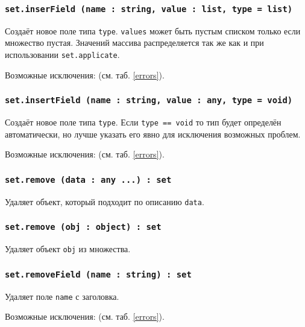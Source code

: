 \subsubsection{\texttt{set.inserField (name : string, value : list, type = list)}}

Создаёт новое поле типа \texttt{type}. \texttt{values} может быть пустым списком только если множество пустая. Значений массива распределяется так же как и при использовании \texttt{set.applicate}.

Возможные исключения:  (см. таб. \ref{errors}).

\subsubsection{\texttt{set.insertField (name : string, value : any, type = void)}}

Создаёт новое поле типа \texttt{type}. Если \texttt{type == void} то тип будет определён автоматически, но лучше указать его явно для исключения возможных проблем.

Возможные исключения:  (см. таб. \ref{errors}).

\subsubsection{\texttt{set.remove (data : any ...) : set}}

Удаляет объект, который подходит по описанию \texttt{data}.

\subsubsection{\texttt{set.remove (obj : object) : set}}

Удаляет объект \texttt{obj} из множества.

\subsubsection{\texttt{set.removeField (name : string) : set}}

Удаляет поле \texttt{name} с заголовка.

Возможные исключения:  (см. таб. \ref{errors}).

